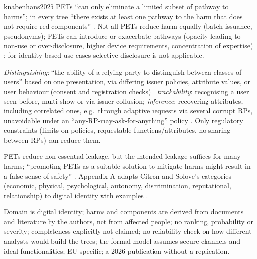 \begin{papercard}{knabenhans2026}
 PETs ``can only eliminate a limited subset of pathway to harms''; in every tree ``there exists at least one pathway to the harm that does not require red components'' . Not all PETs reduce harm equally (batch issuance, pseudonyms); PETs can introduce or exacerbate pathways (opacity leading to non-use or over-disclosure, higher device requirements, concentration of expertise) ; for identity-based use cases selective disclosure is not applicable.

 \emph{Distinguishing}: ``the ability of a relying party to distinguish between classes of users'' based on one presentation, via differing issuer policies, attribute values, or user behaviour (consent and registration checks) ; \emph{trackability}: recognising a user seen before, multi-show or via issuer collusion; \emph{inference}: recovering attributes, including correlated ones, e.g.\ through adaptive requests via several corrupt RPs, unavoidable under an ``any-RP-may-ask-for-anything'' policy . Only regulatory constraints (limits on policies, requestable functions/attributes, no sharing between RPs) can reduce them.

 PETs reduce non-essential leakage, but the intended leakage suffices for many harms; ``promoting PETs as a suitable solution to mitigate harms might result in a false sense of safety'' . Appendix A adapts Citron and Solove's categories (economic, physical, psychological, autonomy, discrimination, reputational, relationship) to digital identity with examples .

 Domain is digital identity; harms and components are derived from documents and literature by the authors, not from affected people; no ranking, probability or severity; completeness explicitly not claimed; no reliability check on how different analysts would build the trees; the formal model assumes secure channels and ideal functionalities; EU-specific; a 2026 publication without a replication.


\end{papercard}
